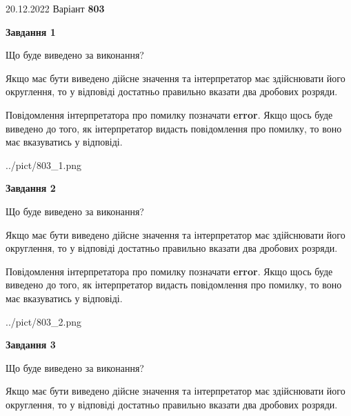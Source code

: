 \documentclass[12pt, ukrainian]{article}
\begin{document}
{20.12.2022 Варіант \No \textbf { 803 }\par}
{
\begin {Large}

{\begin {center}\textbf{Завдання 1}\end {center}}\par
Що буде виведено за виконання? \par

Якщо має бути виведено дійсне значення та інтерпретатор має здійснювати його округлення, 
то у відповіді достатньо правильно вказати два дробових розряди.

Повідомлення інтерпретатора про помилку позначати \textbf{error}.
Якщо щось буде виведено до того, як інтерпретатор видасть повідомлення про помилку, 
то воно має вказуватись у відповіді. \par

\begin{center}
	{../pict/803_1.png}
\end{center}
\newpage

{\begin {center}\textbf{Завдання 2}\end {center}}\par
Що буде виведено за виконання? \par

Якщо має бути виведено дійсне значення та інтерпретатор має здійснювати його округлення, 
то у відповіді достатньо правильно вказати два дробових розряди.

Повідомлення інтерпретатора про помилку позначати \textbf{error}.
Якщо щось буде виведено до того, як інтерпретатор видасть повідомлення про помилку, 
то воно має вказуватись у відповіді. \par

\begin{center}
	{../pict/803_2.png}
\end{center}
\newpage

{\begin {center}\textbf{Завдання 3}\end {center}}\par
Що буде виведено за виконання? \par

Якщо має бути виведено дійсне значення та інтерпретатор має здійснювати його округлення, 
то у відповіді достатньо правильно вказати два дробових розряди.


\end{Large}}
\end{document}
